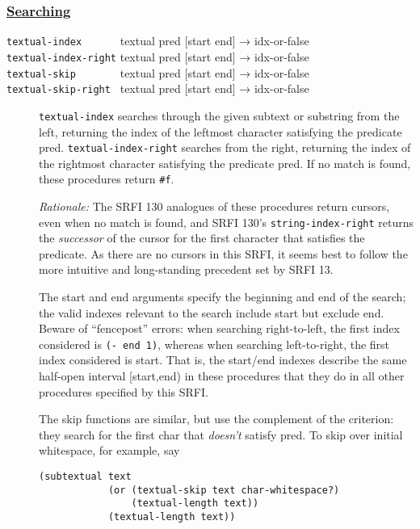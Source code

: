 \subsubsection{\texorpdfstring{\href{}{Searching}}{Searching}}\label{searching}

\begin{description}
\item[ \href{}{} \href{}{} \href{}{} \href{}{}
\texttt{textual-index~~~~~~} textual pred {[}start end{]} →
idx-or-false\\
\texttt{textual-index-right} textual pred {[}start end{]} →
idx-or-false\\
\texttt{textual-skip~~~~~~~} textual pred {[}start end{]} →
idx-or-false\\
\texttt{textual-skip-right~} textual pred {[}start end{]} → idx-or-false
]
\texttt{textual-index} searches through the given subtext or substring
from the left, returning the index of the leftmost character satisfying
the predicate pred. \texttt{textual-index-right} searches from the
right, returning the index of the rightmost character satisfying the
predicate pred. If no match is found, these procedures return
\texttt{\#f}.

\emph{Rationale:} The SRFI 130 analogues of these procedures return
cursors, even when no match is found, and SRFI 130's
\texttt{string-index-right} returns the \emph{successor} of the cursor
for the first character that satisfies the predicate. As there are no
cursors in this SRFI, it seems best to follow the more intuitive and
long-standing precedent set by SRFI 13.

The start and end arguments specify the beginning and end of the search;
the valid indexes relevant to the search include start but exclude end.
Beware of ``fencepost'' errors: when searching right-to-left, the first
index considered is \texttt{(-\ end\ 1)}, whereas when searching
left-to-right, the first index considered is start. That is, the
start/end indexes describe the same half-open interval {[}start,end) in
these procedures that they do in all other procedures specified by this
SRFI.

The skip functions are similar, but use the complement of the criterion:
they search for the first char that \emph{doesn't} satisfy pred. To skip
over initial whitespace, for example, say

\begin{verbatim}
(subtextual text
            (or (textual-skip text char-whitespace?)
                (textual-length text))
            (textual-length text))
\end{verbatim}


\end{description}
